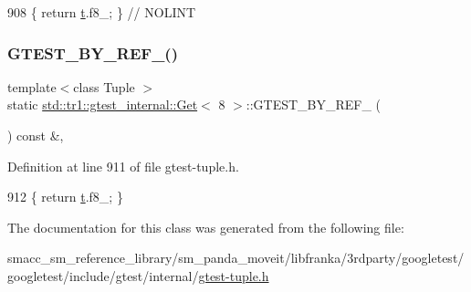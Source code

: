 \begin{DoxyCode}
908                   \{ \textcolor{keywordflow}{return} \hyperlink{namespacebattery__monitor__node_a7a63d20d1ea461e280f4eb5b47f925cd}{t}.f8\_; \}  \textcolor{comment}{// NOLINT}
\end{DoxyCode}
\mbox{\label{classstd_1_1tr1_1_1gtest__internal_1_1Get_3_018_01_4_ab9645513ad2f983157f4062c89e910e7}} 
\subsubsection{\texorpdfstring{G\+T\+E\+S\+T\+\_\+\+B\+Y\+\_\+\+R\+E\+F\+\_\+()}{GTEST\_BY\_REF\_()}}
{\footnotesize\ttfamily template$<$class Tuple $>$ \\
static \hyperlink{classstd_1_1tr1_1_1gtest__internal_1_1Get}{std\+::tr1\+::gtest\+\_\+internal\+::\+Get}$<$ 8 $>$\+::G\+T\+E\+S\+T\+\_\+\+B\+Y\+\_\+\+R\+E\+F\+\_\+ (\begin{DoxyParamCaption}\item[{\hyperlink{gtest-tuple_8h_a1b7f133d8aa02e0b7afed7b66781eeb7}{G\+T\+E\+S\+T\+\_\+\+T\+U\+P\+L\+E\+\_\+\+E\+L\+E\+M\+E\+N\+T\+\_\+}(8, Tuple)}]{ }\end{DoxyParamCaption}) const \&\hspace{0.3cm}{\ttfamily [inline]}, {\ttfamily [static]}}



Definition at line 911 of file gtest-\/tuple.\+h.


\begin{DoxyCode}
912                              \{ \textcolor{keywordflow}{return} \hyperlink{namespacebattery__monitor__node_a7a63d20d1ea461e280f4eb5b47f925cd}{t}.f8\_; \}
\end{DoxyCode}


The documentation for this class was generated from the following file\+:\begin{DoxyCompactItemize}
\item 
smacc\+\_\+sm\+\_\+reference\+\_\+library/sm\+\_\+panda\+\_\+moveit/libfranka/3rdparty/googletest/googletest/include/gtest/internal/\hyperlink{gtest-tuple_8h}{gtest-\/tuple.\+h}\end{DoxyCompactItemize}
